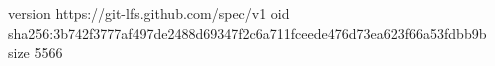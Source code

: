 version https://git-lfs.github.com/spec/v1
oid sha256:3b742f3777af497de2488d69347f2c6a711fceede476d73ea623f66a53fdbb9b
size 5566
